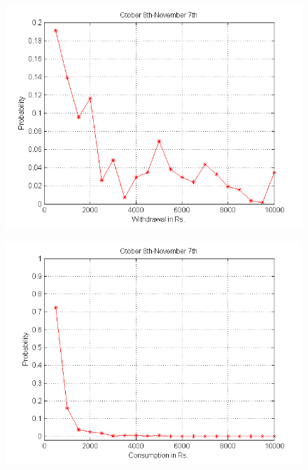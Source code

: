 \documentclass[12pt]{article}
\begin{document}
\begin{figure}
	\centering
	\includegraphics[scale=0.65]{WOCT.png}
	\caption{}
	\label{fig:fig1}
\end{figure}
\begin{figure}
	\centering
	\includegraphics[scale=0.65]{COCT.png}
	\caption{}
	\label{fig:fig2}
\end{figure}
\end{document}
